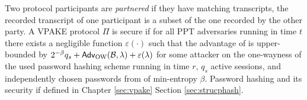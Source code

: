 
\noindent
Two protocol participants are \emph{partnered} if they have matching transcripts, \ie the recorded transcript of one participant is a subset of the one recorded by the other party.
A \ac{VPAKE} protocol $\Pi$ is secure if for all \ac{PPT} adversaries \cA running in time $t$ there exists a negligible function $\varepsilon(\cdot)$ such that the advantage of \cA is upper-bounded by
$2^{-\beta}q_s + \mathsf{Adv}_{\text{OW}}(\mathcal{B}, \lambda) + \varepsilon(\lambda)$
for some attacker \cB on the one-wayness of the used password hashing scheme running in time $r$, $q_s$ active sessions, and independently chosen passwords from \cD of min-entropy $\beta$.
Password hashing and its security if defined in Chapter \ref{sec:vpake} Section \ref{sec:strucphash}.


